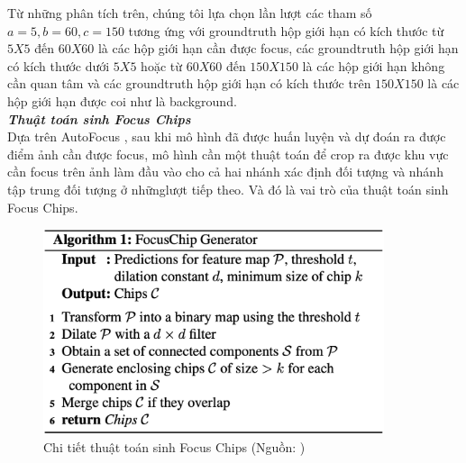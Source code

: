 {    \noindent
    Từ những phân tích trên, chúng tôi lựa chọn lần lượt các tham số $a = 5, b = 60, c = 150$ tương ứng với groundtruth hộp giới hạn có kích thước từ $5 X 5$ đến $60 X 60$ là các hộp giới hạn cần được focus, các groundtruth hộp giới hạn có kích thước dưới $5 X 5$ hoặc từ $60 X 60$ đến $150 X 150$ là các hộp giới hạn không cần quan tâm và các groundtruth hộp giới hạn có kích thước trên $150 X 150$ là các hộp giới hạn được coi như là background. \\

    \noindent
    \textbf{\textit{Thuật toán sinh Focus Chips}} \\
    Dựa trên AutoFocus \cite{najibi2019autofocus}, sau khi mô hình đã được huấn luyện và dự đoán ra được điểm ảnh cần được focus, mô hình cần một thuật toán để crop ra được khu vực cần focus trên ảnh làm đầu vào cho cả hai nhánh xác định đối tượng và nhánh tập trung đối tượng ở nhữnglượt tiếp theo.
    Và đó là vai trò của thuật toán sinh Focus Chips.

    \begin{figure}[H]
        \centering
        \includegraphics[width=10cm] {images/autofocus_focus_chip_gen}
        \caption{Chi tiết thuật toán sinh Focus Chips (Nguồn: \cite{najibi2019autofocus})}
        \label{fig:autofocus_focus_chip_gen}
    \end{figure}

}
